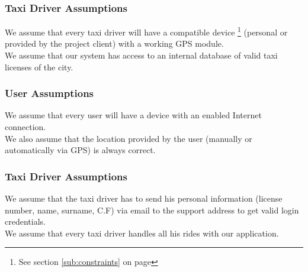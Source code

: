 \subsubsection{Taxi Driver Assumptions} 
We assume that every taxi driver will have a compatible device  \footnote{See section \ref{sub:constraints} on page \pageref{sub:constraints}} (personal or provided by the project client) with a working GPS module.\\
We assume that our system has access to an internal database of valid taxi licenses of the city.
\subsubsection{User Assumptions} 
\label{ssub:user_assumptions}
We assume that every user will have a device with an enabled Internet connection.\\
We also assume that the location provided by the user (manually or automatically via GPS) is always correct.
\subsubsection{Taxi Driver Assumptions} 
\label{ssub:driver_assumptions}
We assume that the taxi driver has to send his personal information (license number, name, surname, C.F) via email to the support address to get valid login credentials.\\ 
We assume that every taxi driver handles all his rides with our application.

